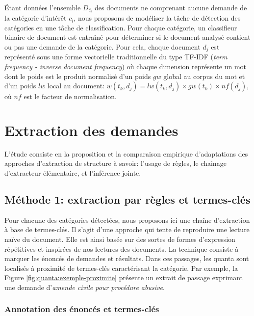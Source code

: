 Étant données l'ensemble $D_{\overline{c_i}}$ des documents ne comprenant aucune demande de la catégorie d'intérêt $c_i$, nous proposons de modéliser la tâche de détection des catégories en une tâche de classification. Pour chaque catégorie, un classifieur binaire de document est entraîné pour déterminer si le document analysé contient ou pas une demande de la catégorie. Pour cela, chaque document $d_j$ est représenté sous une forme vectorielle traditionnelle du type TF-IDF (\textit{term frequency - inverse document frequency}) où chaque dimension représente un mot dont le poids est le produit normalisé d'un poids $gw$ global au corpus du mot et d'un poids $lw$ local au document: $w(t_k, d_j) = lw(t_k, d_j) \times gw(t_k) \times nf(d_j)$, où $nf$ est le facteur de normalisation. 


\section{Extraction des demandes}
\label{sec:quanta:attributs}

L'étude consiste en la proposition et la comparaison empirique d'adaptations des approches d'extraction de structure à savoir: l'usage de règles, le chainage d'extracteur élémentaire, et l'inférence jointe.


\subsection{Méthode 1: extraction par règles et termes-clés}
\label{subsec:quanta:attributs:regles}

Pour chacune des catégories détectées, nous proposons ici une chaîne d'extraction à base de termes-clés. Il s'agit d'une approche qui tente de reproduire une lecture naïve du document. Elle est ainsi basée sur des sortes de formes d'expression répétitives et inspirées de nos lectures des documents. La technique consiste à marquer les énoncés de demandes et résultats. Dans ces passages, les quanta sont localisés à proximité de termes-clés caractérisant la catégorie. Par exemple, la Figure \ref{fig:quanta:exemple-proximite} présente un extrait de passage exprimant une demande d'\textit{amende civile pour procédure abusive}.

\subsubsection{Annotation des énoncés et termes-clés}

